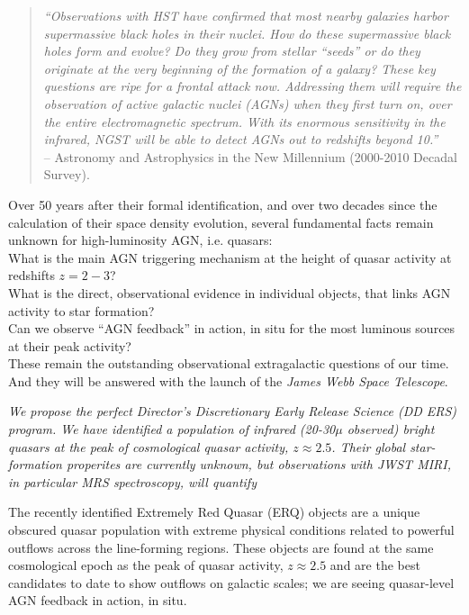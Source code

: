 
\begin{quote}
{\it ``Observations with HST have confirmed that most nearby galaxies harbor supermassive black holes in their nuclei.
How do these supermassive black holes form and evolve? Do they grow from stellar “seeds” or do they originate at the very beginning of the formation of a galaxy? These key questions are ripe for a frontal attack now. Addressing them will require the observation of active galactic nuclei (AGNs) when they first turn on, over the entire electromagnetic spectrum. With its enormous sensitivity in the infrared, NGST will be able to detect AGNs out to redshifts beyond 10.''} \\
-- Astronomy and Astrophysics in the New Millennium (2000-2010 Decadal Survey). 
\end{quote}

\noindent
Over 50 years after their formal identification, and over two decades since the calculation of their space density evolution, several fundamental facts remain unknown for high-luminosity AGN, i.e. quasars: \\
\noindent
What is the main AGN triggering mechanism at the height of quasar activity at redshifts $z=2-3$? \\ 
\noindent
What is the direct, observational evidence in individual objects, that links AGN activity to star formation? \\
\noindent
Can we observe ``AGN feedback'' in action, in situ for the most luminous sources at their peak activity?\\ 

\noindent
These remain the outstanding observational extragalactic questions of
our time. And they will be answered with the launch of the {\it James
Webb Space Telescope}.

\noindent
{\it We propose the perfect Director’s Discretionary Early Release Science (DD ERS) program.
We have identified a population of infrared (20-30$\mu$ observed) bright quasars at the peak 
of cosmological quasar activity, $z\approx2.5$. 
Their global star-formation properites are currently unknown, but observations with JWST MIRI, 
in particular MRS spectroscopy, will quantify 
}


\smallskip \smallskip
\noindent
The recently identified Extremely Red Quasar (ERQ) objects are a
unique obscured quasar population with extreme physical conditions
related to powerful outflows across the line-forming regions. These
objects are found at the same cosmological epoch as the peak of quasar
activity, $z\approx2.5$ and are the best candidates to date to show
outflows on galactic scales; we are seeing quasar-level AGN feedback
in action, in situ. 

